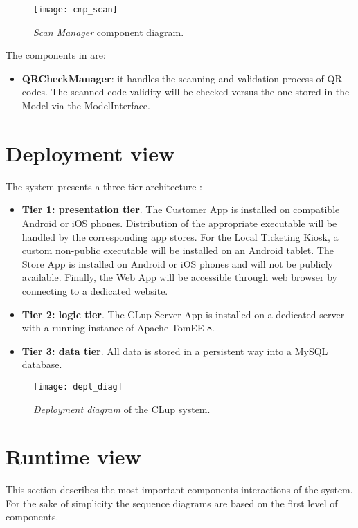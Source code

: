 \begin{figure}[H]
	\centering
	\texttt{[image: cmp\_scan]}
	\caption{\textit{Scan Manager} component diagram.}
	\label{fig:cmp_scan}
\end{figure}

The components in  are:
\begin{itemize}
	\item \textbf{QRCheckManager}: it handles the scanning and validation process of QR codes. The scanned code validity will be checked versus the one stored in the Model via the ModelInterface.
\end{itemize}
\clearpage

\section{Deployment view}
The system presents a three tier architecture :
\begin{itemize}
	\item \textbf{Tier 1: presentation tier}. The Customer App is installed on compatible Android or iOS phones. Distribution of the appropriate executable will be handled by the corresponding app stores. For the Local Ticketing Kiosk, a custom non-public executable will be installed on an Android tablet.\newline
	The Store App is installed on Android or iOS phones and will not be publicly available.\newline
	Finally, the Web App will be accessible through web browser by connecting to a dedicated website.
	
	\item \textbf{Tier 2: logic tier}. The CLup Server App is installed on a dedicated server with a running instance of Apache TomEE 8.
	
	\item \textbf{Tier 3: data tier}. All data is stored in a persistent way into a MySQL database.
\end{itemize}


\begin{figure}[H]
	\centering
	\texttt{[image: depl\_diag]}
	\caption{\textit{Deployment diagram} of the CLup system.}
	\label{fig:depl_diag}
\end{figure}
\clearpage

\section{Runtime view}
This section describes the most important components interactions of the system.\newline
For the sake of simplicity the sequence diagrams are based on the first level of components. 
